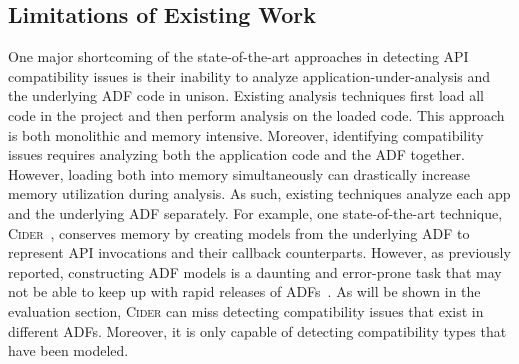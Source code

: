\subsection{Limitations of Existing Work}
\label{limitations}
One major shortcoming of the state-of-the-art
approaches in detecting API compatibility issues is
their inability to analyze application-under-analysis
and the underlying ADF code in unison.  Existing
analysis techniques first load all code in the project and
then perform analysis on the loaded code.  This
approach is both monolithic and memory intensive.
Moreover, identifying compatibility issues requires analyzing both the application code and the ADF together. However, loading both into memory simultaneously can drastically increase memory utilization during analysis. 
As such, existing techniques analyze each app and the underlying ADF separately.
For example, one state-of-the-art technique,
\textsc{Cider}~\cite{huang2018understanding}, 
conserves memory by creating models from the
underlying ADF to represent API invocations and their callback counterparts. However, as previously reported, constructing ADF models is a daunting and error-prone task that may not be able to keep up with rapid releases of ADFs~\cite{vanderMerwe2012}.
As will be shown in the evaluation section, \textsc{Cider} can miss detecting compatibility issues that exist in different ADFs.
Moreover, it is only capable of detecting compatibility types that have been modeled.

